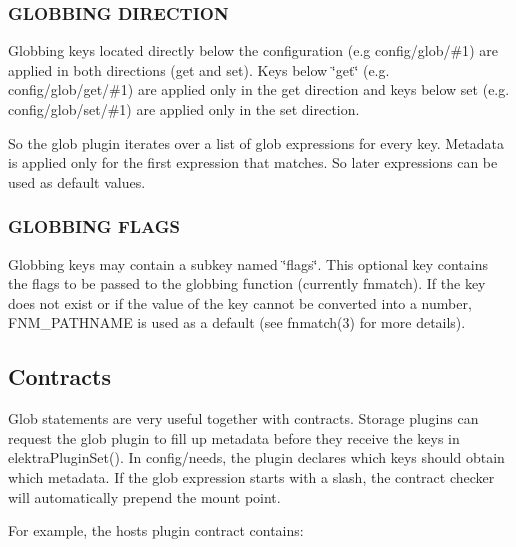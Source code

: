 \subsubsection*{G\+L\+O\+B\+B\+I\+N\+G D\+I\+R\+E\+C\+T\+I\+O\+N}

Globbing keys located directly below the configuration (e.\+g {\ttfamily config/glob/\#1}) are applied in both directions (get and set). Keys below \char`\"{}get\char`\"{} (e.\+g. {\ttfamily config/glob/get/\#1}) are applied only in the get direction and keys below set (e.\+g. {\ttfamily config/glob/set/\#1}) are applied only in the set direction.

So the glob plugin iterates over a list of glob expressions for every key. Metadata is applied only for the first expression that matches. So later expressions can be used as default values.

\subsubsection*{G\+L\+O\+B\+B\+I\+N\+G F\+L\+A\+G\+S}

Globbing keys may contain a subkey named \char`\"{}flags\char`\"{}. This optional key contains the flags to be passed to the globbing function (currently fnmatch). If the key does not exist or if the value of the key cannot be converted into a number, F\+N\+M\+\_\+\+P\+A\+T\+H\+N\+A\+M\+E is used as a default (see fnmatch(3) for more details).

\subsection*{Contracts}

Glob statements are very useful together with contracts. Storage plugins can request the glob plugin to fill up metadata before they receive the keys in {\ttfamily elektra\+Plugin\+Set()}. In {\ttfamily config/needs}, the plugin declares which keys should obtain which metadata. If the glob expression starts with a slash, the contract checker will automatically prepend the mount point.

For example, the hosts plugin contract contains\+: 


